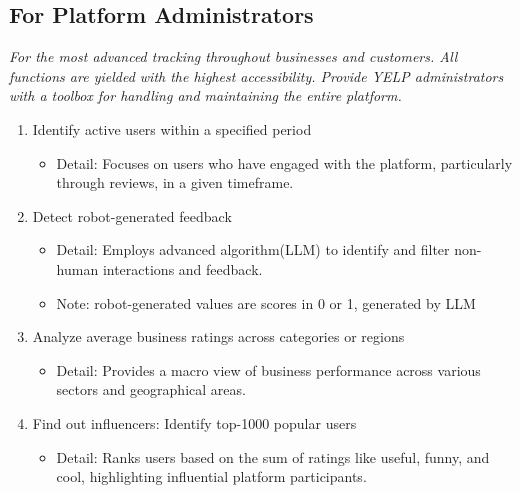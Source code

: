 \documentclass[runningheads]{llncs}
\begin{document}
\subsection{For Platform Administrators}

\textit{For the most advanced tracking throughout businesses and customers. All functions are yielded with the highest accessibility. Provide YELP administrators with a toolbox for handling and maintaining the entire platform.}



\begin{enumerate}

    \item Identify active users within a specified period

    \begin{itemize}
        \item[\textbullet] Detail: Focuses on users who have engaged with the platform, particularly through reviews, in a given timeframe.
    \end{itemize}
    
    \item Detect robot-generated feedback
    \begin{itemize}
        \item[\textbullet] Detail: Employs advanced algorithm(LLM) to identify and filter non-human interactions and feedback.
        \item[\textbullet] Note: robot-generated values are scores in 0 or 1, generated by LLM
    \end{itemize}


    \item Analyze average business ratings across categories or regions
    
   \begin{itemize}
        \item[\textbullet] Detail: Provides a macro view of business performance across various sectors and geographical areas.
    \end{itemize}
    

    \item Find out influencers: Identify top-1000 popular users
    
    \begin{itemize}
        \item[\textbullet] Detail: Ranks users based on the sum of ratings like useful, funny, and cool, highlighting influential platform participants.
    \end{itemize}


\end{enumerate}
\end{document}

